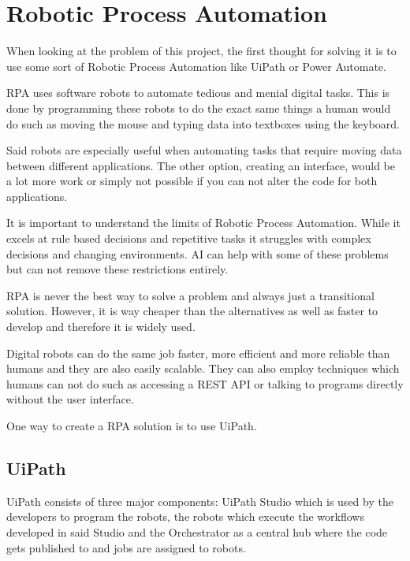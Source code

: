 \section{Robotic Process Automation}

When looking at the problem of this project, the first thought for solving it is to use some sort of Robotic Process Automation like UiPath or Power Automate.

RPA uses software robots to automate tedious and menial digital tasks. This is done by programming these robots to do the exact same things a human would do such as moving the mouse and typing data into textboxes using the keyboard. 

Said robots are especially useful when automating tasks that require moving data between different applications. The other option, creating an interface, would be a lot more work or simply not possible if you can not alter the code for both applications.

It is important to understand the limits of Robotic Process Automation. While it excels at rule based decisions and repetitive tasks it struggles with complex decisions and changing environments.
AI can help with some of these problems but can not remove these restrictions entirely.

RPA is never the best way to solve a problem and always just a transitional solution. However, it is way cheaper than the alternatives as well as faster to develop and therefore it is widely used.

Digital robots can do the same job faster, more efficient and more reliable than humans and they are also easily scalable. They can also employ techniques which humans can not do such as accessing a REST API or talking to programs directly without the user interface.

\cite{RPAFundamentals}

One way to create a RPA solution is to use UiPath.

\subsection{UiPath}

UiPath consists of three major components: UiPath Studio which is used by the developers to program the robots, the robots which execute the workflows developed in said Studio and the Orchestrator as a central hub where the code gets published to and jobs are assigned to robots.

